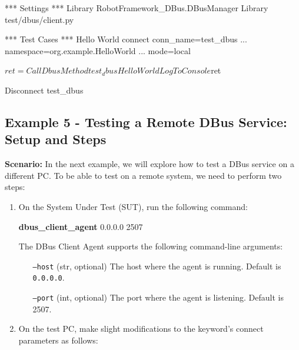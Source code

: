 \begin{robotcode}
*** Settings ***
Library    RobotFramework_DBus.DBusManager
Library    test/dbus/client.py

*** Test Cases ***
Hello World
   connect    conn_name=test_dbus
   ...        namespace=org.example.HelloWorld
   ...        mode=local

   ${ret}=    Call Dbus Method    test_dbus    Hello    World
   Log To Console    ${ret}

   Disconnect    test_dbus
\end{robotcode}


\hypertarget{description-example5}{%
\subsection{\texorpdfstring{\textbf{Example 5 - Testing a Remote DBus Service: Setup and Steps}}{Example 5 - Testing a Remote DBus Service: Setup and Steps}}\label{description-example5}}

\textbf{Scenario:}
In the next example, we will explore how to test a DBus service on a different PC. To be able to test on a remote system, we need to perform two steps:

\begin{enumerate}
\item On the System Under Test (SUT), run the following command:

	\textbf{dbus\_client\_agent}  0.0.0.0  2507

		The DBus Client Agent supports the following command-line arguments:

		\begin{itemize}
			\setlength{\itemindent}{10em}
			\item [\texttt{--host} (str, optional)] The host where the agent is running. Default is \texttt{0.0.0.0}.
			\item [\texttt{--port} (int, optional)] The port where the agent is listening. Default is 2507.
		\end{itemize}

\item On the test PC, make slight modifications to the keyword's connect parameters as follows:
\end{enumerate}

